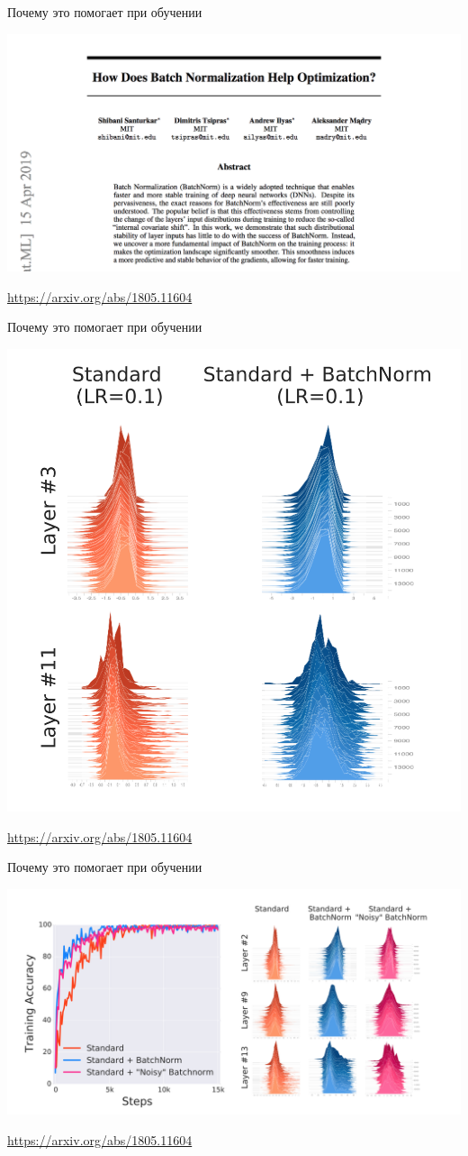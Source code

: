 \documentclass[notes,12pt, aspectratio=169]{beamer}
\begin{document}
\begin{frame}{Почему это помогает при обучении}
	\begin{center}
		\includegraphics[width=.8\linewidth]{how_bn_help.png}
	\end{center}
	\vfill
	\footnotesize
	{\color{blue} \url{https://arxiv.org/abs/1805.11604}}
\end{frame}


\begin{frame}{Почему это помогает при обучении}
	\begin{center}
		\includegraphics[width=.45\linewidth]{how_bn_help_2.png}
	\end{center}
	\vfill
	\footnotesize
	{\color{blue} \url{https://arxiv.org/abs/1805.11604}}
\end{frame}


\begin{frame}{Почему это помогает при обучении}
	\begin{center}
		\includegraphics[width=.9\linewidth]{how_bn_help_3.png}
	\end{center}
	\vfill
	\footnotesize
	{\color{blue} \url{https://arxiv.org/abs/1805.11604}}
\end{frame}
\end{document}
